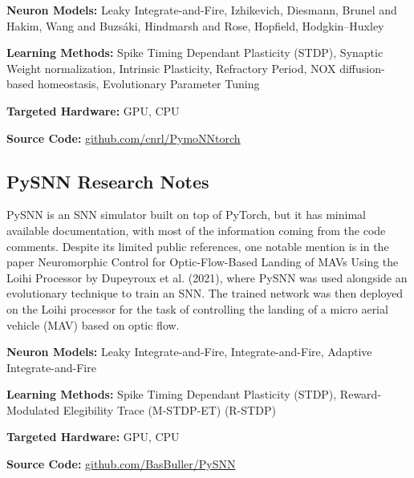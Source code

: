 \begin{tcolorbox}[enhanced,attach boxed title to top center={yshift=-3mm,yshifttext=-1mm}, colback=blue!5!white,colframe=blue!75!black,colbacktitle=red!80!black, title=PymoNNtorch at a Glance,fonttitle=\bfseries, boxed title style={size=small,colframe=red!50!black} ]

\textbf{Neuron Models:} Leaky Integrate-and-Fire, Izhikevich, Diesmann, Brunel and Hakim, Wang and Buzsáki, Hindmarsh and Rose, Hopfield, Hodgkin–Huxley

\textbf{Learning Methods:} Spike Timing Dependant Plasticity (STDP), Synaptic Weight normalization, Intrinsic Plasticity, Refractory Period, NOX diffusion-based homeostasis, Evolutionary Parameter Tuning  

\textbf{Targeted Hardware:} GPU, CPU 

\textbf{Source Code:} \href{https://github.com/cnrl/PymoNNtorch}{github.com/cnrl/PymoNNtorch}
\end{tcolorbox}
\subsection*{PySNN Research Notes}\label{PySNN}

PySNN is an SNN simulator built on top of PyTorch, but it has minimal available documentation, with most of the information coming from the code comments. Despite its limited public references, one notable mention is in the paper Neuromorphic Control for Optic-Flow-Based Landing of MAVs Using the Loihi Processor by Dupeyroux et al. (2021), where PySNN was used alongside an evolutionary technique to train an SNN. The trained network was then deployed on the Loihi processor for the task of controlling the landing of a micro aerial vehicle (MAV) based on optic flow.

\begin{tcolorbox}[enhanced,attach boxed title to top center={yshift=-3mm,yshifttext=-1mm}, colback=blue!5!white,colframe=blue!75!black,colbacktitle=red!80!black, title=PySNN at a Glance,fonttitle=\bfseries, boxed title style={size=small,colframe=red!50!black} ]

\textbf{Neuron Models:} Leaky Integrate-and-Fire, Integrate-and-Fire, Adaptive Integrate-and-Fire

\textbf{Learning Methods:} Spike Timing Dependant Plasticity (STDP), Reward-Modulated Elegibility Trace (M-STDP-ET) (R-STDP)  

\textbf{Targeted Hardware:} GPU, CPU 

\textbf{Source Code:} \href{https://github.com/BasBuller/PySNN}{github.com/BasBuller/PySNN}
\end{tcolorbox}
